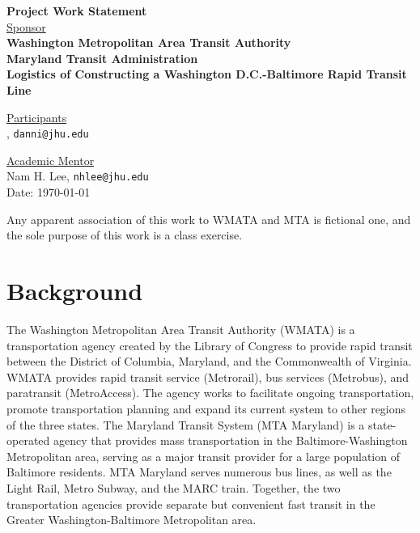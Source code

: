 \documentclass[12pt,letterpaper]{article}
\theoremstyle{definition}
\begin{document}
\def\shiftdowna{0.32in}  %
\def\shiftdownb{0.22in}  %


\begin{center}
\textbf{{\large Project Work Statement}}\\


\vspace \shiftdowna
\underline {Sponsor}\\ 
\vspace{5pt}
\textbf{{\large Washington Metropolitan Area Transit Authority}}\\
\vspace{5pt}
\textbf{{\large Maryland Transit Administration}}\\


\vspace \shiftdowna
\textbf{{\large Logistics of Constructing a Washington D.C.-Baltimore Rapid Transit Line}}


\vspace{0.35in}
\vspace \shiftdownb
\underline {Participants} \\
\vspace{5pt}
, \texttt{danni@jhu.edu}

\vspace \shiftdownb
\underline {Academic Mentor}\\
\vspace{5pt}
Nam H. Lee, \texttt{nhlee@jhu.edu} \\

\vspace \shiftdowna
Date: \today

\end{center}

\vfill  
\footnoterule
\noindent \small{Any apparent association of this work to WMATA and MTA is
fictional one, and the sole purpose of this work is a class exercise.}

\newpage

\section{Background} 
The Washington Metropolitan Area Transit Authority (WMATA) is a transportation agency created by the Library of Congress to provide rapid transit between the District of Columbia, Maryland, and the Commonwealth of Virginia. WMATA provides rapid transit service (Metrorail), bus services (Metrobus), and paratransit (MetroAccess). The agency works to facilitate ongoing transportation, promote transportation planning and expand its current system to other regions of the three states. The Maryland Transit System (MTA Maryland) is a state-operated agency that provides mass transportation in the Baltimore-Washington Metropolitan area, serving as a major transit provider for a large population of Baltimore residents. MTA Maryland serves numerous bus lines, as well as the Light Rail, Metro Subway, and the MARC train. Together, the two transportation agencies provide separate but convenient fast transit in the Greater Washington-Baltimore Metropolitan area.
\end{document}
